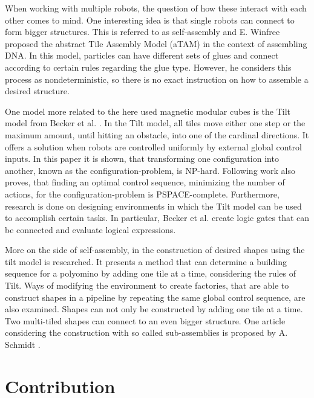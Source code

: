 When working with multiple robots, the question of how these interact with each other comes to mind.
One interesting idea is that single robots can connect to form bigger structures.
This is referred to as self-assembly and E. Winfree \cite{winfree1998} proposed the abstract Tile Assembly Model (aTAM) in the context of assembling DNA.
In this model, particles can have different sets of glues and connect according to certain rules regarding the glue type.
However, he considers this process as nondeterministic, so there is no exact instruction on how to assemble a desired structure.

One model more related to the here used magnetic modular cubes is the Tilt model from Becker et al. \cite{Becker2014_SP}.
In the Tilt model, all tiles move either one step or the maximum amount, until hitting an obstacle, into one of the cardinal directions.
It offers a solution when robots are controlled uniformly by external global control inputs.
In this paper it is shown, that transforming one configuration into another, known as the configuration-problem, is NP-hard.
Following work \cite{Becker2014} also proves, that finding an optimal control sequence, minimizing the number of actions, for the configuration-problem is PSPACE-complete.
Furthermore, research is done on designing environments in which the Tilt model can be used to accomplish certain tasks.
In particular, Becker et al. create logic gates that can be connected and evaluate logical expressions.

More on the side of self-assembly, in \cite{Fekete2020} the construction of desired shapes using the tilt model is researched.
It presents a method that can determine a building sequence for a polyomino by adding one tile at a time, considering the rules of Tilt.
Ways of modifying the environment to create factories, that are able to construct shapes in a pipeline by repeating the same global control sequence, are also examined.
Shapes can not only be constructed by adding one tile at a time.
Two multi-tiled shapes can connect to an even bigger structure.
One article considering the construction with so called sub-assemblies is proposed by A. Schmidt \cite{Schmidt2018}.



  

\begin{comment}
Different methods for motion planning:

simple discrete planning

sample-based planning

Tilt assembly 

- global control ...
- Applications	
- reconfiguration problem PSPACE Complete

Construction of shapes

- what can be done with complex enviroment
- on tile at a time
- sub-assemblies

Magnetic cubes

- explain cubes with magnets, pivotwalking
- discrete planner
- enumeration of polyominoes, consider fixed polys
\end{comment}



\section{Contribution}
